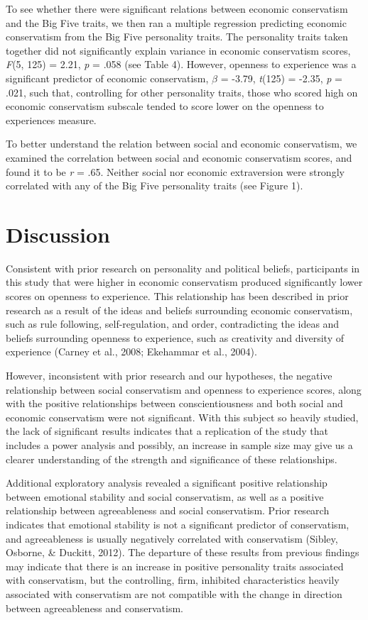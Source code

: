 \documentclass[man]{apa6}
\begin{document}
To see whether there were significant relations between economic conservatism and the Big Five traits, we then ran a multiple regression predicting economic conservatism from the Big Five personality traits. The personality traits taken together did not significantly explain variance in economic conservatism scores, \emph{F}(5, 125) = 2.21, \emph{p} = .058 (see Table 4). However, openness to experience was a significant predictor of economic conservatism, \(\beta\) = -3.79, \emph{t}(125) = -2.35, \emph{p} = .021, such that, controlling for other personality traits, those who scored high on economic conservatism subscale tended to score lower on the openness to experiences measure.

To better understand the relation between social and economic conservatism, we examined the correlation between social and economic conservatism scores, and found it to be \emph{r} = .65. Neither social nor economic extraversion were strongly correlated with any of the Big Five personality traits (see Figure 1).

\hypertarget{discussion}{%
\section{Discussion}\label{discussion}}

Consistent with prior research on personality and political beliefs, participants in this study that were higher in economic conservatism produced significantly lower scores on openness to experience. This relationship has been described in prior research as a result of the ideas and beliefs surrounding economic conservatism, such as rule following, self-regulation, and order, contradicting the ideas and beliefs surrounding openness to experience, such as creativity and diversity of experience (Carney et al., 2008; Ekehammar et al., 2004).

However, inconsistent with prior research and our hypotheses, the negative relationship between social conservatism and openness to experience scores, along with the positive relationships between conscientiousness and both social and economic conservatism were not significant. With this subject so heavily studied, the lack of significant results indicates that a replication of the study that includes a power analysis and possibly, an increase in sample size may give us a clearer understanding of the strength and significance of these relationships.

Additional exploratory analysis revealed a significant positive relationship between emotional stability and social conservatism, as well as a positive relationship between agreeableness and social conservatism. Prior research indicates that emotional stability is not a significant predictor of conservatism, and agreeableness is usually negatively correlated with conservatism (Sibley, Osborne, \& Duckitt, 2012). The departure of these results from previous findings may indicate that there is an increase in positive personality traits associated with conservatism, but the controlling, firm, inhibited characteristics heavily associated with conservatism are not compatible with the change in direction between agreeableness and conservatism.
\end{document}
